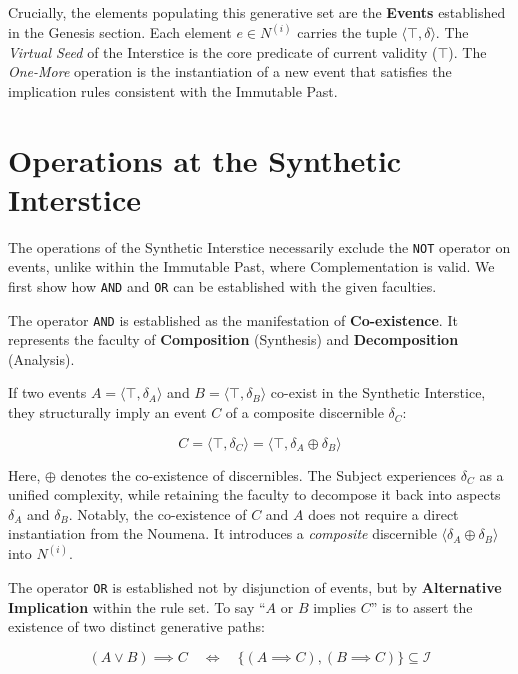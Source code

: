 \documentclass[11pt, a4paper]{article}
\theoremstyle{formalism}
\begin{document}
Crucially, the elements populating this generative set are the \textbf{Events}
established in the Genesis section. Each element $e \in N^{(i)}$ carries the
tuple $\langle \top, \delta \rangle$. The \textit{Virtual Seed} of the
Interstice is the core predicate of current validity ($\top$). The \textit{One-More} 
operation is the instantiation of a new event that satisfies the implication 
rules consistent with the Immutable Past.

\section{Operations at the Synthetic Interstice}

The operations of the Synthetic Interstice necessarily exclude the \texttt{NOT}
operator on events, unlike within the Immutable Past, where Complementation is
valid. We first show how \texttt{AND} and \texttt{OR} can be established with
the given faculties.

The operator \texttt{AND} is established as the manifestation of
\textbf{Co-existence}. It represents the faculty of \textbf{Composition}
(Synthesis) and \textbf{Decomposition} (Analysis). 

If two events $A = \langle \top, \delta_A \rangle$ and $B = \langle \top,
\delta_B \rangle$ co-exist in the Synthetic Interstice, they structurally imply
an event $C$ of a composite discernible $\delta_C$:

\begin{equation}
     C = \langle \top, \delta_C \rangle = \langle \top, \delta_A \oplus \delta_B \rangle
\end{equation}

Here, $\oplus$ denotes the co-existence of discernibles. The Subject
experiences $\delta_C$ as a unified complexity, while retaining the faculty to
decompose it back into aspects $\delta_A$ and $\delta_B$. Notably, the
co-existence of $C$ and $A$ does not require a direct instantiation from the
Noumena. It introduces a \textit{composite} discernible $\langle \delta_A \oplus
\delta_B \rangle$ into $N^{(i)}$.

The operator \texttt{OR} is established not by disjunction of events, but by
\textbf{Alternative Implication} within the rule set. To say ``$A$ or $B$
implies $C$'' is to assert the existence of two distinct generative paths:

\begin{equation}
    (A \lor B) \implies C \quad \iff \quad \{ (A \implies C), (B \implies C) \} \subseteq \mathcal{I}
\end{equation}
\end{document}
